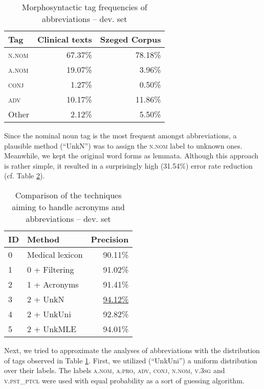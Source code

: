 \begin{table}[H]
\centering
\caption{Morphosyntactic tag frequencies of abbreviations -- dev. set}
\label{tab:pos_distribution}
\begin{tabular}{ l r r} 
\hline
Tag & Clinical texts & Szeged Corpus  \\ 
\hline
\scshape{n.nom} & 67.37\% & 78.18\% \\
\scshape{a.nom} & 19.07\% & 3.96\% \\
\scshape{conj} & 1.27\% & 0.50\% \\
\scshape{adv} & 10.17\% & 11.86\% \\
Other & 2.12\% & 5.50\% \\
\hline
\end{tabular}
\end{table}

Since the nominal noun tag is the most frequent amongst abbreviations, a plausible method (``UnkN'') was to assign the \textsc{n.nom} label to unknown ones. 
Meanwhile, we kept the original word forms as lemmata. 
Although this approach is rather simple, it resulted in a surprisingly high (31.54\%) error rate reduction (cf. Table \ref{tab:abbrev_fixes}). 

\begin{table}[H]
\centering
\caption{Comparison of the techniques aiming to handle acronyms and abbreviations --  dev. set}
\label{tab:abbrev_fixes}
\begin{tabular}{ l l r } 
\hline
ID & Method &  Precision \\
\hline
0 & Medical lexicon & 90.11\% \\
1 & 0 + Filtering & 91.02\% \\
2 & 1 + Acronyms & 91.41\% \\
3 & 2 + UnkN & \underline{94.12\%} \\
4 & 2 + UnkUni & 92.82\% \\
5 & 2 + UnkMLE & 94.01\% \\
\hline
\end{tabular}
\end{table}

Next, we tried to approximate the analyses of abbreviations with the distribution of tags observed in Table \ref{tab:pos_distribution}. 
First, we utilized (``UnkUni'') a uniform distribution over their labels. %
The labels \textsc{a.nom}, \textsc{a.pro}, \textsc{adv}, \textsc{conj}, \textsc{n.nom}, \textsc{v.3sg} and \textsc{v.pst\_ptcl} were used with equal probability as a sort of guessing algorithm.

